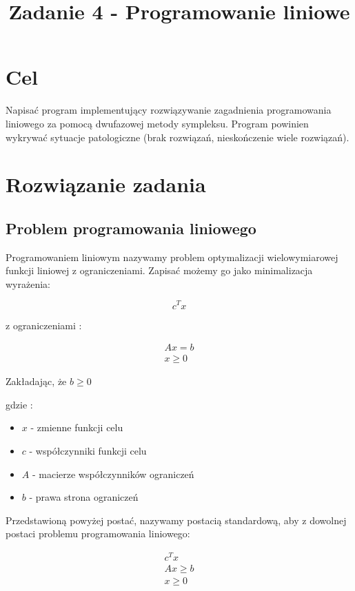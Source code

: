 \documentclass{classrep}
\author{
  \studentinfo{Paweł Musiał}{178726} \and
  \studentinfo{Łukasz Michalski}{178724}
}
\title{Zadanie 4 - Programowanie liniowe} %
\begin{document}
\maketitle

\section{Cel}
Napisać program implementujący rozwiązywanie zagadnienia programowania liniowego za pomocą dwufazowej metody sympleksu. Program powinien wykrywać sytuacje patologiczne (brak rozwiązań, nieskończenie wiele rozwiązań).

\section{Rozwiązanie zadania}

\subsection{Problem programowania liniowego}

Programowaniem liniowym nazywamy problem optymalizacji wielowymiarowej funkcji liniowej z ograniczeniami. Zapisać możemy go jako minimalizacja wyrażenia:

\begin{equation}
c^{T}x
\end{equation}

z ograniczeniami :

\begin{align}
  Ax=b \nonumber \\
  x \geq 0
\end{align}

Zakładając, że $b \geq 0$

gdzie :

\begin{itemize}
\item $x$ - zmienne funkcji celu
\item $c$ - współczynniki funkcji celu
\item $A$ - macierze współczynników ograniczeń
\item $b$ - prawa strona ograniczeń
\end{itemize}

Przedstawioną powyżej postać, nazywamy postacią standardową, aby z dowolnej postaci problemu programowania liniowego:

\begin{align}
c^{T}x \nonumber \\
Ax \geq b  \nonumber \\
x \geq 0
\end{align}
\end{document}
